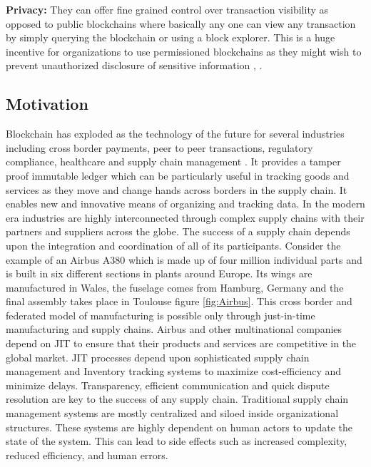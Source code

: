 \textbf{Privacy:}
They can offer fine grained control over transaction visibility as opposed to public blockchains where basically any one can view any transaction by simply querying the blockchain or using a block explorer. This is a huge incentive for organizations to use permissioned blockchains as they might wish to prevent unauthorized disclosure of sensitive information \cite{misc:018}, \cite{misc:017}.
\clearpage
\subsection{Motivation}
Blockchain has exploded as the technology of the future for several industries including cross border payments, peer to peer transactions, regulatory compliance, healthcare and supply chain management \cite{misc:021}. It provides a tamper proof immutable ledger which can be particularly useful in tracking goods and services as they move and change hands across borders in the supply chain. It enables new and innovative means of organizing and tracking data. In the modern era industries are highly interconnected through complex supply chains with their partners and suppliers across the globe. The success of a supply chain depends upon the integration and coordination of all of its participants. Consider the example of an Airbus A380 which is made up of four million individual parts and is built in six different sections in plants around Europe. Its wings are manufactured in Wales, the fuselage comes from Hamburg, Germany and the final assembly takes place in Toulouse figure \ref{fig:Airbus}. This cross border and federated model of manufacturing is possible only through just-in-time manufacturing and supply chains. Airbus and other multinational companies depend on JIT to ensure that their products and services are competitive in the global market. JIT processes depend upon sophisticated supply chain management and Inventory tracking systems to maximize cost-efficiency and minimize delays. Transparency, efficient communication and quick dispute resolution are key to the success of any supply chain. Traditional supply chain management systems are mostly centralized and siloed inside organizational structures. These systems are highly dependent on human actors to update the state of the system. This can lead to side effects such as increased complexity, reduced efficiency, and human errors.

